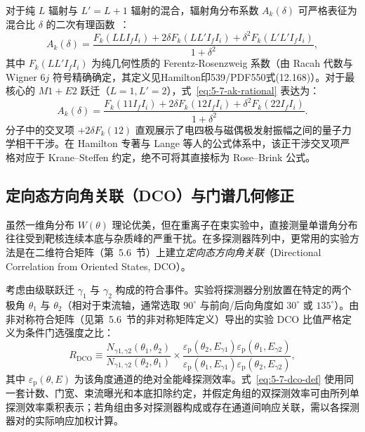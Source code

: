 对于纯 $L$ 辐射与 $L'=L+1$ 辐射的混合，辐射角分布系数 $A_k(\delta)$ 可严格表征为混合比 $\delta$ 的二次有理函数~\cite{lange-kumar-hamilton-1982-multipole-admixtures}：
\begin{equation}\label{eq:5-7-ak-rational}
A_k(\delta) = \frac{F_k(L L I_f I_i) + 2\delta F_k(L L' I_f I_i) + \delta^2 F_k(L' L' I_f I_i)}{1 + \delta^2},
\end{equation}
其中 $F_k(L L' I_f I_i)$ 为纯几何性质的 Ferentz-Rosenzweig 系数（由 Racah 代数与 Wigner $6j$ 符号精确确定，其定义见Hamilton印539/PDF550式(12.168)）。对于最核心的 $M1+E2$ 跃迁（$L=1, L'=2$），式~\eqref{eq:5-7-ak-rational} 表达为：
\begin{equation}\label{eq:5-7-ak-m1e2}
A_k(\delta) = \frac{F_k(1 1 I_f I_i) + 2\delta F_k(1 2 I_f I_i) + \delta^2 F_k(2 2 I_f I_i)}{1 + \delta^2}.
\end{equation}
分子中的交叉项 $+2\delta F_k(1 2)$ 直观展示了电四极与磁偶极发射振幅之间的量子力学相干干涉。在 Hamilton 专著与 Lange 等人的公式体系中，该正干涉交叉项严格对应于 Krane--Steffen 约定，绝不可将其直接标为 Rose--Brink 公式。

\subsection{定向态方向角关联（DCO）与门谱几何修正}\label{subsec:5-7-3}

虽然一维角分布 $W(\theta)$ 理论优美，但在重离子在束实验中，直接测量单谱角分布往往受到靶核连续本底与杂质峰的严重干扰。在多探测器阵列中，更常用的实验方法是在二维符合矩阵（第~5.6~节）上建立\emph{定向态方向角关联}（Directional Correlation from Oriented States, DCO）。

考虑由级联跃迁 $\gamma_1$ 与 $\gamma_2$ 构成的符合事件。实验将探测器分别放置在特定的两个极角 $\theta_1$ 与 $\theta_2$（相对于束流轴，通常选取 $90^\circ$ 与前向/后向角度如 $30^\circ$ 或 $135^\circ$）。由非对称符合矩阵（见第~5.6~节的非对称矩阵定义）导出的实验 DCO 比值严格定义为条件门选强度之比：
\begin{equation}\label{eq:5-7-dco-def}
R_{\mathrm{DCO}} \equiv \frac{N_{\gamma 1, \gamma 2}(\theta_1, \theta_2)}{N_{\gamma 1, \gamma 2}(\theta_2, \theta_1)} \times \frac{\varepsilon_{\mathrm{p}}(\theta_2, E_{\gamma 1}) \varepsilon_{\mathrm{p}}(\theta_1, E_{\gamma 2})}{\varepsilon_{\mathrm{p}}(\theta_1, E_{\gamma 1}) \varepsilon_{\mathrm{p}}(\theta_2, E_{\gamma 2})},
\end{equation}
其中 $\varepsilon_{\mathrm{p}}(\theta, E)$ 为该角度通道的绝对全能峰探测效率。式~\eqref{eq:5-7-dco-def} 使用同一套计数、门宽、束流曝光和本底扣除约定，并假定角组的双探测效率可由所列单探测效率乘积表示；若角组由多对探测器构成或存在通道间响应关联，需以各探测器对的实际响应加权计算。

